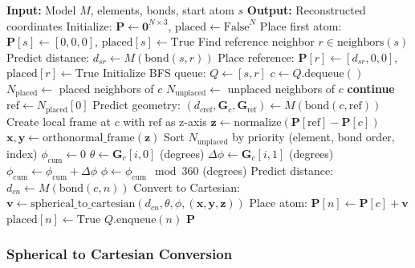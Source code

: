 \documentclass[11pt,a4paper]{article}
\begin{document}
\begin{algorithm}
\caption{BFS Reconstruction from Center}
\begin{algorithmic}[1]
\State \textbf{Input:} Model $M$, elements, bonds, start atom $s$
\State \textbf{Output:} Reconstructed coordinates
\State
\State Initialize: $\mathbf{P} \gets \mathbf{0}^{N \times 3}$, $\text{placed} \gets \text{False}^N$
\State
\State Place first atom: $\mathbf{P}[s] \gets [0, 0, 0]$, $\text{placed}[s] \gets \text{True}$
\State
\State Find reference neighbor $r \in \text{neighbors}(s)$
\State Predict distance: $d_{sr} \gets M(\text{bond}(s, r))$
\State Place reference: $\mathbf{P}[r] \gets [d_{sr}, 0, 0]$, $\text{placed}[r] \gets \text{True}$
\State
\State Initialize BFS queue: $Q \gets [s, r]$
\State
{}
    \State $c \gets Q.\text{dequeue}()$
    \State $N_{\text{placed}} \gets$ placed neighbors of $c$
    \State $N_{\text{unplaced}} \gets$ unplaced neighbors of $c$
        \State \textbf{continue}
    \EndIf
    \State
    \State $\text{ref} \gets N_{\text{placed}}[0]$
    \State Predict geometry: $(d_{c\text{ref}}, \mathbf{G}_c, \mathbf{G}_{\text{ref}}) \gets M(\text{bond}(c, \text{ref}))$
    \State
    \State Create local frame at $c$ with $\text{ref}$ as z-axis
    \State $\mathbf{z} \gets \text{normalize}(\mathbf{P}[\text{ref}] - \mathbf{P}[c])$
    \State $\mathbf{x}, \mathbf{y} \gets \text{orthonormal\_frame}(\mathbf{z})$
    \State
    \State Sort $N_{\text{unplaced}}$ by priority (element, bond order, index)
    \State $\phi_{\text{cum}} \gets 0$
        \State $\theta \gets \mathbf{G}_c[i, 0]$ (degrees)
        \State $\Delta\phi \gets \mathbf{G}_c[i, 1]$ (degrees)
        \State $\phi_{\text{cum}} \gets \phi_{\text{cum}} + \Delta\phi$
        \State $\phi \gets \phi_{\text{cum}} \mod 360$ (degrees)
        \State
        \State Predict distance: $d_{cn} \gets M(\text{bond}(c, n))$
        \State
        \State Convert to Cartesian: $\mathbf{v} \gets \text{spherical\_to\_cartesian}(d_{cn}, \theta, \phi, (\mathbf{x}, \mathbf{y}, \mathbf{z}))$
        \State Place atom: $\mathbf{P}[n] \gets \mathbf{P}[c] + \mathbf{v}$
        \State $\text{placed}[n] \gets \text{True}$
        \State $Q.\text{enqueue}(n)$
    \EndFor
\EndWhile
\State
\State \Return $\mathbf{P}$
\end{algorithmic}
\end{algorithm}

\subsubsection{Spherical to Cartesian Conversion}
\end{document}
